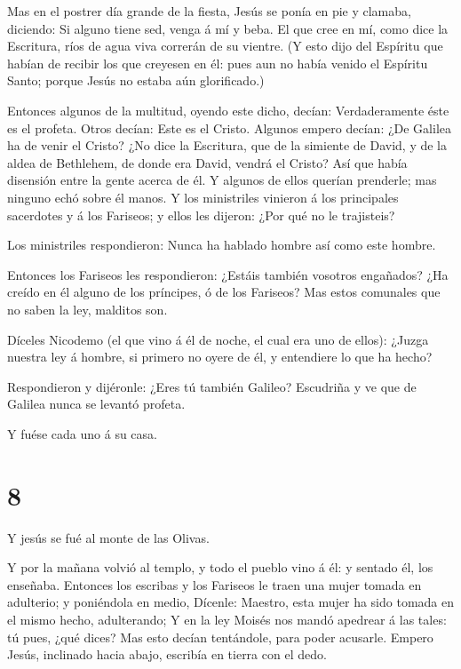  Mas en el postrer día grande de la fiesta, Jesús se ponía
en pie y clamaba, diciendo: Si alguno tiene sed, venga á mí y beba.
 El que cree en mí, como dice la Escritura, ríos de agua
viva correrán de su vientre.  (Y esto dijo del Espíritu que
habían de recibir los que creyesen en él: pues aun no había venido el
Espíritu Santo; porque Jesús no estaba aún glorificado.)

 Entonces algunos de la multitud, oyendo este dicho,
decían: Verdaderamente éste es el profeta.  Otros decían:
Este es el Cristo. Algunos empero decían: ¿De Galilea ha de venir el
Cristo?  ¿No dice la Escritura, que de la simiente de
David, y de la aldea de Bethlehem, de donde era David, vendrá el Cristo?
 Así que había disensión entre la gente acerca de él.
 Y algunos de ellos querían prenderle; mas ninguno echó
sobre él manos.  Y los ministriles vinieron á los
principales sacerdotes y á los Fariseos; y ellos les dijeron: ¿Por qué
no le trajisteis?

 Los ministriles respondieron: Nunca ha hablado hombre así
como este hombre.

 Entonces los Fariseos les respondieron: ¿Estáis también
vosotros engañados?  ¿Ha creído en él alguno de los
príncipes, ó de los Fariseos?  Mas estos comunales que no
saben la ley, malditos son.

 Díceles Nicodemo (el que vino á él de noche, el cual era
uno de ellos):  ¿Juzga nuestra ley á hombre, si primero no
oyere de él, y entendiere lo que ha hecho?

 Respondieron y dijéronle: ¿Eres tú también Galileo?
Escudriña y ve que de Galilea nunca se levantó profeta.

 Y fuése cada uno á su casa.

\hypertarget{section-7}{%
\section{8}\label{section-7}}

 Y jesús se fué al monte de las Olivas.

 Y por la mañana volvió al templo, y todo el pueblo vino á
él: y sentado él, los enseñaba.  Entonces los escribas y los
Fariseos le traen una mujer tomada en adulterio; y poniéndola en medio,
 Dícenle: Maestro, esta mujer ha sido tomada en el mismo
hecho, adulterando;  Y en la ley Moisés nos mandó apedrear á
las tales: tú pues, ¿qué dices?  Mas esto decían tentándole,
para poder acusarle. Empero Jesús, inclinado hacia abajo, escribía en
tierra con el dedo.

